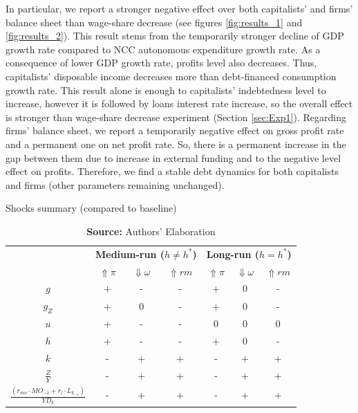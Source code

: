\documentclass[11pt]{article}
\begin{document}
In particular, we report a stronger negative effect over both capitalists' and firms' balance sheet than wage-share decrease (see figures \ref{fig:results_1} and \ref{fig:results_2}).
This result stems from the temporarily stronger decline of GDP growth rate compared to NCC autonomous expenditure growth rate.
As a consequence of lower GDP growth rate, profits level also decreases.
Thus, capitalists' disposable income decreases more than debt-financed consumption growth rate.
This result alone is enough to capitalists' indebtedness level to increase, however it is followed by loans interest rate increase, so the overall effect is stronger than wage-share decrease experiment (Section \ref{sec:Exp1}).
Regarding firms' balance sheet, we report a temporarily negative effect on gross profit rate and a permanent one on net profit rate. 
So, there is a permanent increase in the gap between them due to increase in external funding and to the negative level effect on profits.
Therefore, we find a stable debt dynamics for both capitalists and firms (other parameters remaining unchanged).

\begin{table}[H]
	\centering
	\caption{Shocks summary (compared to baseline)}
	\label{ResumoChoques}
		\begin{tabular}{c|c|c|c||c|c|c}
			\hline\hline
			\multirow{2}{*}{} & \multicolumn{3}{c||}{\textbf{Medium-run ($h \neq h^*$)}} & \multicolumn{3}{c}{\textbf{Long-run ($h = h^*$)}} \\ \cline{2-7} 
			&  \textbf{$\Uparrow \pi$} & \textbf{$\Downarrow \omega$} & \textbf{$\Uparrow rm$} &  \textbf{$\Uparrow \pi$} & \textbf{$\Downarrow \omega$} & \textbf{$\Uparrow rm$} \\ \hline
			\textbf{$g$}  & + & - & - & + & 0 & - \\ \hline
			\textbf{$g_Z$}  & + & 0 & -  & + & 0 & - \\ \hline
			\textbf{$u$}  & + & - & -  & 0 & 0 & 0 \\ \hline
			\textbf{$h$}  & + & - & -  & + & 0 & - \\ \hline
			\textbf{$k$}  & - & + & +  & - & + & + \\ \hline
			\textbf{$\frac{Z}{Y}$}  & - & + & +  & - & + & + \\ \hline
			\textit{$\frac{(r_{mo}\cdot MO_{-1} + r_l\cdot L_{k_{-1}})}{YD_k}$}  & - & + & +  & - & + & + \\ \hline\hline
		\end{tabular}%
	\caption*{\textbf{Source:} Authors' Elaboration}
\end{table}
\end{document}
